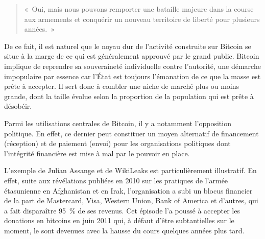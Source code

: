 \begin{quote}
«~Oui, mais nous pouvons remporter une bataille majeure dans la course aux armements et conquérir un nouveau territoire de liberté pour plusieurs années.~»
\end{quote}

De ce fait, il est naturel que le noyau dur de l'activité construite sur Bitcoin se situe à la marge de ce qui est généralement approuvé par le grand public. Bitcoin implique de reprendre sa souveraineté individuelle contre l'autorité, une démarche impopulaire par essence car l'État est toujours l'émanation de ce que la masse est prête à accepter. Il sert donc à combler une niche de marché plus ou moins grande, dont la taille évolue selon la proportion de la population qui est prête à désobéir.


Parmi les utilisations centrales de Bitcoin, il y a notamment l'opposition politique. En effet, ce dernier peut constituer un moyen alternatif de financement (réception) et de paiement (envoi) pour les organisations politiques dont l'intégrité financière est mise à mal par le pouvoir en place.

L'exemple de Julian Assange et de WikiLeaks est particulièrement illustratif. En effet, suite aux révélations publiées en 2010 sur les pratiques de l'armée étasunienne en Afghanistan et en Irak, l'organisation a subi un blocus financier de la part de Mastercard, Visa, Western Union, Bank of America et d'autres, qui a fait disparaître 95~\% de ses revenus. Cet épisode l'a poussé à accepter les donations en bitcoins en juin 2011 qui, à défaut d'être subtantielles sur le moment, le sont devenues avec la hausse du cours quelques années plus tard.

